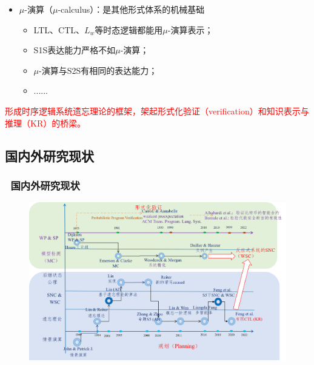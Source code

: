 \documentclass[9pt, CJK]{beamer}
\begin{document}
\begin{frame}
{{\begin{itemize}
\begin{itemize}
\begin{itemize}
				\end{itemize} 
			\end{itemize}
			\item $\mu$-演算（$\mu$-calculus）：是其他形式体系的机械基础
			\begin{itemize}
				\item LTL、CTL、$L_w$等时态逻辑都能用$\mu$-演算表示；
				\item S1S表达能力严格不如$\mu$-演算；
				\item $\mu$-演算与S2S有相同的表达能力；
				\item ......
			\end{itemize}
		\end{itemize}  
\textcolor{red}{形成时序逻辑系统遗忘理论的框架，架起形式化验证（verification）和知识表示与推理（KR）的桥梁。}}
	}
	\end{frame}
	
	\subsection{国内外研究现状} 
	\begin{frame}
		\frametitle{~国内外研究现状}
		\begin{figure}
			\includegraphics[scale=0.35]{figures/history2}
		\end{figure}
	\end{frame}
\end{document}
